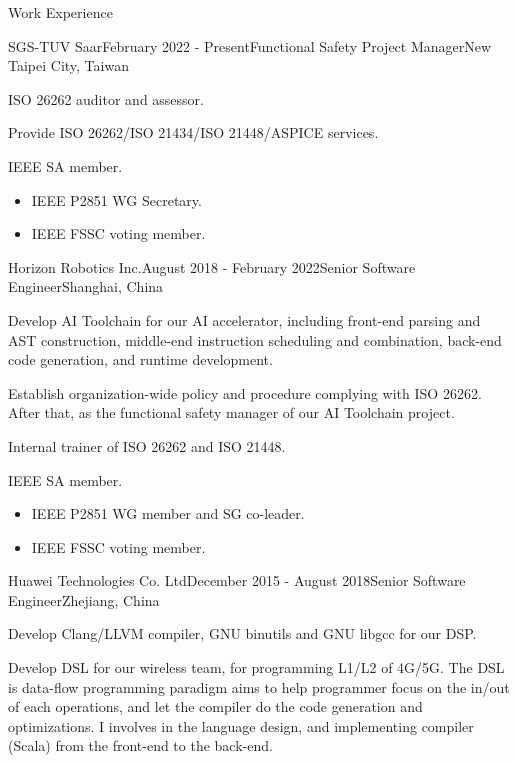 \documentclass{resume} %
\begin{document}
\begin{rSection}{Work Experience}

\begin{rSubsection}{SGS-TUV Saar}{February 2022 - Present}{Functional Safety Project Manager}{New Taipei City, Taiwan}
\item ISO 26262 auditor and assessor.
\item Provide ISO 26262/ISO 21434/ISO 21448/ASPICE services.
\item IEEE SA member.
\begin{itemize}
\item IEEE P2851 WG Secretary.
\item IEEE FSSC voting member.
\end{itemize}
\end{rSubsection}

\begin{rSubsection}{Horizon Robotics Inc.}{August 2018 - February 2022}{Senior Software Engineer}{Shanghai, China}
\item Develop AI Toolchain for our AI accelerator, including front-end parsing and AST construction, middle-end instruction scheduling and combination, back-end code generation, and runtime development. 
\item Establish organization-wide policy and procedure complying with ISO 26262. After that, as the functional safety manager of our AI Toolchain project.
\item Internal trainer of ISO 26262 and ISO 21448.
\item IEEE SA member.
\begin{itemize}
\item IEEE P2851 WG member and SG co-leader.
\item IEEE FSSC voting member.
\end{itemize}
\end{rSubsection}


\begin{rSubsection}{Huawei Technologies Co. Ltd}{December 2015 - August 2018}{Senior Software Engineer}{Zhejiang, China}
\item Develop Clang/LLVM compiler, GNU binutils and GNU libgcc for our DSP.
\item Develop DSL for our wireless team, for programming L1/L2 of 4G/5G. The DSL is data-flow programming paradigm aims to help programmer focus on the in/out of each operations, and let the compiler do the code generation and optimizations. I involves in the language design, and implementing compiler (Scala) from the front-end to the back-end.
\end{rSubsection}


\end{rSection}
\end{document}
